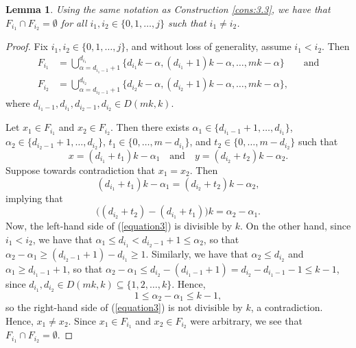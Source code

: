 \documentclass{article}
\newtheorem{lemma}[theorem]{Lemma}
\theoremstyle{definition}
\theoremstyle{remark}
\begin{document}
\begin{lemma}\label{lem:disjointf}
    Using the same notation as Construction \ref{cons:3.3}, we have that $F_{i_1} \cap F_{i_2} = \emptyset$ for all $i_{1},i_{2} \in \{0,1,\ldots,j\}$ such that $i_1 \neq i_2$.
\end{lemma}

\begin{proof}
    Fix $i_{1},i_{2} \in \{0,1,\ldots,j\}$, and without loss of generality, assume $i_1 < i_2$. Then \begin{align*}
        F_{i_1} &= \bigcup_{\alpha = d_{i_1-1}+1}^{d_{i_1}}\{d_{i_1}k-\alpha,(d_{i_1}+1)k-\alpha,\ldots,mk-\alpha\} \qquad \text{and} \\
        F_{i_2} &= \bigcup_{\alpha = d_{i_2-1}+1}^{d_{i_2}}\{d_{i_2}k-\alpha,(d_{i_2}+1)k-\alpha,\ldots,mk-\alpha\},
    \end{align*} where $d_{i_{1}-1},d_{i_1},d_{i_{2}-1},d_{i_2} \in D(mk,k)$.
    
    Let $x_1 \in F_{i_1}$ and $x_{2} \in F_{i_2}$. Then there exists $\alpha_1 \in \{d_{{i_1}-1}+1,\ldots,d_{i_1}\}$, $\alpha_2 \in \{d_{{i_2}-1}+1,\ldots,d_{i_{2}}\}$, $t_1 \in \{0,\ldots,m-d_{i_1}\}$, and $t_2 \in \{0,\ldots,m-d_{i_2}\}$ such that \begin{equation*}
        x = (d_{i_1}+t_1)k-\alpha_1 \quad \text{and} \quad y=(d_{i_2}+t_2)k-\alpha_2.
    \end{equation*} Suppose towards contradiction that $x_1 = x_2$. Then \begin{equation*}
        (d_{i_1}+t_1)k-\alpha_1 = (d_{i_2}+t_2)k-\alpha_2,
    \end{equation*} implying that \begin{equation}\label{equation3}
        \Big((d_{i_2}+t_2)-(d_{i_1}+t_1)\Big)k = \alpha_2-\alpha_1.
    \end{equation} Now, the left-hand side of (\ref{equation3}) is divisible by $k$. On the other hand, since $i_1 < i_2$, we have that $\alpha_1 \leq d_{i_1} < d_{i_2-1}+1 \leq \alpha_2$, so that $\alpha_2 - \alpha_1 \geq (d_{{i_2}-1}+1)-d_{i_1} \geq 1$. Similarly, we have that $\alpha_2 \leq d_{i_2}$ and $\alpha_1 \geq d_{i_{1}-1} +1$, so that $\alpha_2 - \alpha_1 \leq d_{i_2}-(d_{i_{1}-1}+1) = d_{i_2}-d_{i_{1}-1}-1 \leq k-1$, since $d_{i_1},d_{i_2} \in D(mk,k) \subseteq \{1,2,\ldots,k\}$. Hence, \begin{equation*}
        1 \leq \alpha_2-\alpha_1 \leq k-1,
    \end{equation*} so the right-hand side of (\ref{equation3}) is not divisible by $k$, a contradiction. Hence, $x_1 \neq x_2$. Since $x_1 \in F_{i_1}$ and $x_2 \in F_{i_2}$ were arbitrary, we see that $F_{i_1} \cap F_{i_{2}} = \emptyset$.
\end{proof}
\end{document}
